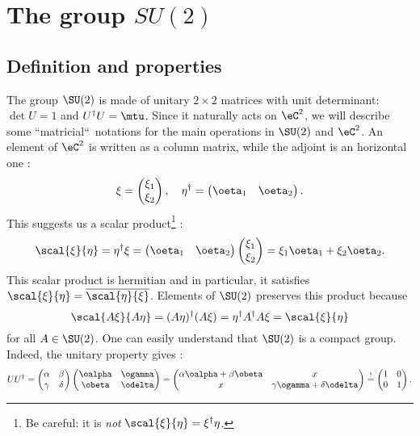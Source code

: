 \section{The group \texorpdfstring{$SU(2)$}{SU2}}

					\subsection{Definition and properties}

The group $\SU(2)$ is made of unitary $2\times 2$ matrices with unit determinant: $\det U=1$ and $U^{\dag} U=\mtu$. Since it naturally acts on $\eC^2$, we will describe some ``matricial``\ notations for the main operations in $\SU(2)$ and $\eC^2$. An element of $\eC^2$ is written as a column matrix, while the adjoint is an horizontal one :
\[
   \xi=\begin{pmatrix}
\xi_1 \\ 
\xi_2
\end{pmatrix},\quad 
   \eta^{\dag}=\begin{pmatrix}
\oeta_1  &\oeta_2
\end{pmatrix}.
\]
This suggests us a scalar product\footnote{Be careful: it is \emph{not} $\scal{\xi}{\eta}=\xi^{\dag}\eta$.} :
\[
   \scal{\xi}{\eta}=\eta^{\dag}\xi= \begin{pmatrix}
                                     \oeta_1  &\oeta_2
                                   \end{pmatrix}
   \begin{pmatrix}
\xi_1 \\ 
\xi_2
\end{pmatrix}=\xi_1\oeta_1+\xi_2\oeta_2.
\]
This scalar product is hermitian and in particular, it satisfies $\scal{\xi}{\eta}=\overline{\scal{\eta}{\xi}}$. Elements of $\SU(2)$ preserves this product because 
\[
   \scal{A\xi}{A\eta}=(A\eta)^{\dag}(A\xi)=\eta^{\dag} A^{\dag} A\xi=\scal{\xi}{\eta}
\]
for all $A\in\SU(2)$. One can easily understand that $\SU(2)$ is a compact group. Indeed, the unitary property gives :
\[
UU^{\dag}=
\begin{pmatrix}
\alpha & \beta \\ 
\gamma & \delta
\end{pmatrix} 
\begin{pmatrix}
\oalpha & \ogamma \\ 
\obeta & \odelta
\end{pmatrix}
=
\begin{pmatrix}
\alpha\oalpha+\beta\obeta & x \\ 
x & \gamma\ogamma+\delta\odelta
\end{pmatrix}
\stackrel{!}{=}
\begin{pmatrix}
1  & 0 \\ 
0 & 1
\end{pmatrix}.
\]
